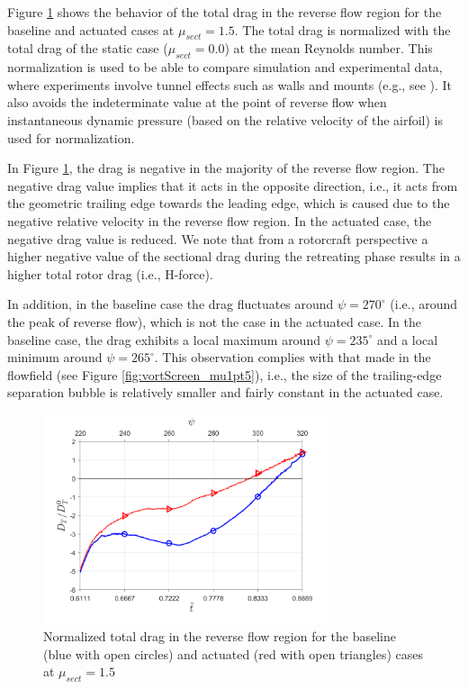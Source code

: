 Figure \ref{fig:total_drag_zoomed_mu_1pt5} shows the behavior of the total drag in the reverse flow region for the baseline and actuated cases at $\mu_{sect}=1.5$. The total drag is normalized with the total drag of the static case ($\mu_{sect}=0.0$) at the mean Reynolds number. 
This normalization is used to be able to compare simulation and experimental data, where experiments involve tunnel effects such as walls and mounts (e.g., see \cite{bib:kocher2017}).
It also avoids the indeterminate value at the point of reverse flow when instantaneous dynamic pressure (based on the relative velocity of the airfoil) is used for normalization.

In Figure \ref{fig:total_drag_zoomed_mu_1pt5}, the drag is negative in the majority of the reverse flow region.
The negative drag value implies that it acts in the opposite direction, i.e., it acts from the geometric trailing edge towards the leading edge, which is caused due to the negative relative velocity in the reverse flow region.
In the actuated case, the negative drag value is reduced.
We note that from a rotorcraft perspective a higher negative value of the sectional drag during the retreating phase results in a higher total rotor drag (i.e., H-force).

In addition, in the baseline case the drag fluctuates around $\psi=270^\circ$ (i.e., around the peak of reverse flow), which is not the case in the actuated case.
In the baseline case, the drag exhibits a local maximum around $\psi=235^\circ$ and a local minimum around $\psi=265^\circ$.
This observation complies with that made in the flowfield (see Figure \ref{fig:vortScreen_mu1pt5}), i.e., the size of the trailing-edge separation bubble is relatively smaller and fairly constant in the actuated case.

\begin{figure}[H]
	
	\centering
	\includegraphics[width=0.75\textwidth]{figures/Zoomed_Drag_tot_NACA0012_Re1m_aoa10_1pt5_3.png}
	\caption{Normalized total drag in the reverse flow region for the baseline (blue with open circles) and actuated (red with open triangles) cases at $\mu_{sect}=1.5$}
	\label{fig:total_drag_zoomed_mu_1pt5}
\end{figure}


